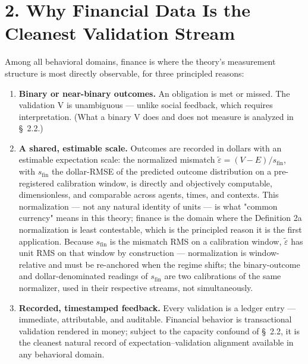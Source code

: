 \documentclass[11pt,twocolumn]{article}
\begin{document}
\section*{2. Why Financial Data Is the Cleanest Validation Stream}

Among all behavioral domains, finance is where the theory's measurement structure is most directly observable, for three principled reasons:

\begin{enumerate}
\item \textbf{Binary or near-binary outcomes.} An obligation is met or missed. The validation V is unambiguous --- unlike social feedback, which requires interpretation. (What a binary V does and does not measure is analyzed in \S~2.2.)
\item \textbf{A shared, estimable scale.} Outcomes are recorded in dollars with an estimable expectation scale: the normalized mismatch $\tilde{\varepsilon} = (V - E)/s_{\mathrm{fin}}$, with $s_{\mathrm{fin}}$ the dollar-RMSE of the predicted outcome distribution on a pre-registered calibration window, is directly and objectively computable, dimensionless, and comparable across agents, times, and contexts. This normalization --- not any natural identity of units --- is what "common currency" means in this theory; finance is the domain where the Definition 2a normalization is least contestable, which is the principled reason it is the first application. Because $s_{\mathrm{fin}}$ is the mismatch RMS on a calibration window, $\tilde{\varepsilon}$ has unit RMS on that window by construction --- normalization is window-relative and must be re-anchored when the regime shifts; the binary-outcome and dollar-denominated readings of $s_{\mathrm{fin}}$ are two calibrations of the same normalizer, used in their respective streams, not simultaneously.
\item \textbf{Recorded, timestamped feedback.} Every validation is a ledger entry --- immediate, attributable, and auditable. Financial behavior is transactional validation rendered in money; subject to the capacity confound of \S~2.2, it is the cleanest natural record of expectation--validation alignment available in any behavioral domain.
\end{enumerate}
\end{document}
